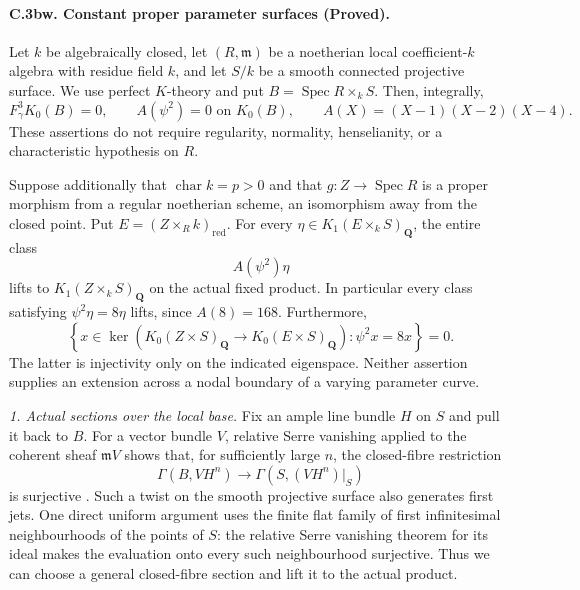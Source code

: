\paragraph{C.3bw. Constant proper parameter surfaces (Proved).}
Let $k$ be algebraically closed, let $(R,\mathfrak m)$ be a
noetherian local coefficient-$k$ algebra with residue field $k$,
and let $S/k$ be a smooth connected projective surface. We use
perfect $K$-theory and put $B=\operatorname{Spec}R\times_k S$.
Then, integrally,
\begin{equation}
 F_\gamma^3K_0(B)=0,\qquad
 A(\psi^2)=0\text{ on }K_0(B),\qquad
 A(X)=(X-1)(X-2)(X-4).
                                                        \tag{PS.1}
\end{equation}
These assertions do not require regularity, normality,
henselianity, or a characteristic hypothesis on $R$.

Suppose additionally that $\operatorname{char}k=p>0$ and that
$g:Z\to\operatorname{Spec}R$ is a proper morphism from a regular
noetherian scheme, an isomorphism away from the closed point.
Put $E=(Z\times_Rk)_{\mathrm{red}}$. For every
$\eta\in K_1(E\times_kS)_{\mathbf Q}$, the entire class
\begin{equation}
                    A(\psi^2)\eta
                                                        \tag{PS.2}
\end{equation}
lifts to $K_1(Z\times_kS)_{\mathbf Q}$ on the actual fixed
product. In particular every class satisfying
$\psi^2\eta=8\eta$ lifts, since $A(8)=168$.
Furthermore,
\begin{equation}
 \left\{x\in\ker\left(K_0(Z\times S)_{\mathbf Q}
                    \longrightarrow K_0(E\times S)_{\mathbf Q}\right)
                  :\psi^2x=8x\right\}=0.
                                                        \tag{PS.3}
\end{equation}
The latter is injectivity only on the indicated eigenspace.
Neither assertion supplies an extension across a nodal boundary
of a varying parameter curve.

\emph{1. Actual sections over the local base.}
Fix an ample line bundle $H$ on $S$ and pull it back to $B$.
For a vector bundle $V$, relative Serre vanishing applied to
the coherent sheaf $\mathfrak mV$ shows that, for sufficiently
large $n$, the closed-fibre restriction
\[
 \Gamma(B,VH^n)\longrightarrow\Gamma(S,(VH^n)|_S)
\]
is surjective \citep[Lemma 30.17.1]{frC3azStacksSerre}.
Such a twist on the smooth projective surface also generates
first jets. One direct uniform argument uses the finite flat
family of first infinitesimal neighbourhoods of the points of $S$:
the relative Serre vanishing theorem for its ideal makes the
evaluation onto every such neighbourhood surjective. Thus we
can choose a general closed-fibre section and lift it to the
actual product.

